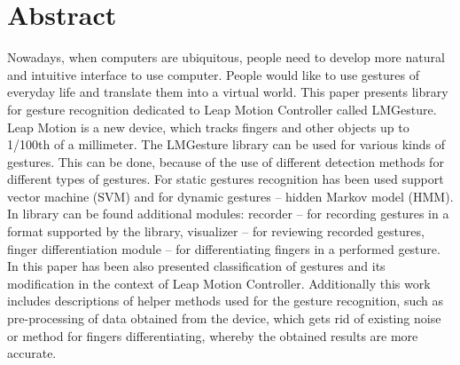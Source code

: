 
\chapter{Abstract}
Nowadays, when computers are ubiquitous, people need to develop more natural and intuitive interface to use computer. People would like to use gestures of everyday life and translate them into a virtual world. This paper presents library for gesture recognition dedicated to Leap Motion Controller called LMGesture.  Leap Motion is a new device, which tracks fingers and other objects up to 1/100th of a millimeter. The LMGesture library can be used for various kinds of gestures. This can be done, because of the use of different detection methods for different types of gestures. For static gestures recognition has been used support vector machine (SVM) and for dynamic gestures -- hidden Markov model (HMM). In library can be found additional modules: recorder -- for recording gestures in a format supported by the library, visualizer -- for reviewing recorded gestures, finger differentiation module -- for differentiating fingers in a performed gesture.  In this paper has been also presented classification of gestures and its modification in the context of Leap Motion Controller. Additionally this work includes descriptions of helper methods used for the gesture recognition, such as pre-processing of data obtained from the device, which gets rid of existing noise or method for fingers differentiating, whereby the obtained results are more accurate.
